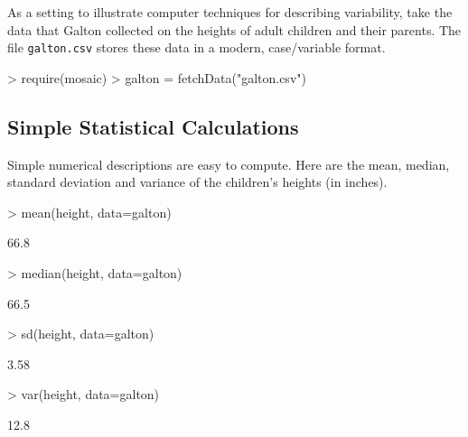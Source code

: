 


As a setting to illustrate computer techniques for describing variability, take
the data that Galton collected on the heights of adult children
and their parents. \datasetGalton
The file \texttt{galton.csv} stores these data in a modern,
case/variable format.

\begin{Schunk}
\begin{Sinput}
> require(mosaic)
> galton = fetchData("galton.csv")
\end{Sinput}
\end{Schunk}

\subsection{Simple Statistical Calculations}


Simple numerical descriptions are easy to compute.  Here are the mean,
median, standard deviation and variance of the children's heights (in
inches).
\begin{Schunk}
\begin{Sinput}
> mean(height, data=galton)
\end{Sinput}
\begin{Soutput}
[1] 66.8
\end{Soutput}
\begin{Sinput}
> median(height, data=galton)
\end{Sinput}
\begin{Soutput}
[1] 66.5
\end{Soutput}
\begin{Sinput}
> sd(height, data=galton)
\end{Sinput}
\begin{Soutput}
[1] 3.58
\end{Soutput}
\begin{Sinput}
> var(height, data=galton)
\end{Sinput}
\begin{Soutput}
[1] 12.8
\end{Soutput}
\end{Schunk}

